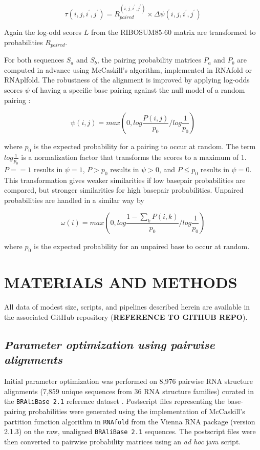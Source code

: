 \documentclass[a4paper,twoside]{article}
\newcommand\bralibase{\texttt{BRAliBase 2.1}}
\begin{document}
\begin{equation}\label{eq10}
	\tau(i,j,i^\prime,j^\prime) = R_{paired}^{(i,j,i^\prime,j^\prime)}
\times \Delta \psi(i,j,i^\prime,j^\prime)
\end{equation}

Again the log-odd scores $L$ from the RIBOSUM85-60 matrix \cite{Klein14499004}
are transformed to probabilities $R_{paired}$.

For both sequences $S_a$ and $S_b$, the pairing probability matrices $P_a$ and
$P_b$ are computed in advance using McCaskill's algorithm, implemented in
RNAfold or RNAplfold. The robustness of the alignment is improved by applying
log-odds scores $\psi$ of having a specific base pairing against the null model
of a random pairing \cite{Will17432929}:

\begin{equation}\label{eq11}
	\psi(i,j) = max \left( 0, log \frac{P(i,j)}{p_0} / log \frac{1}{p_0} \right)
\end{equation}

where $p_0$ is the expected probability for a pairing to occur at random. The
term $log \frac{1}{p_0}$ is a normalization factor that transforms the scores to
a maximum of 1. $P==1$ results in $\psi=1$, $P>p_0$ results in $\psi>0$, and $P\le
p_0$ results in $\psi=0$.  This transformation gives weaker similarities if low
basepair probabilities are compared, but stronger similarities for high basepair
probabilities. Unpaired probabilities are handled in a similar way by

\begin{equation}\label{eq12}
	\omega(i) = max \left( 0, log \frac{1 - \sum_k P(i,k)}{p_0} / log \frac{1}{p_0} \right)
\end{equation}

where $p_0$ is the expected probability for an unpaired base to occur at
random.

\section{\uppercase{Materials and Methods}}

\noindent All data of modest size, scripts, and pipelines described herein are available in the associated 
GitHub repository (\textbf{REFERENCE TO GITHUB REPO}).

\subsection{\textit{Parameter optimization using pairwise alignments}}
Initial parameter optimization was performed on  8,976 pairwise RNA structure 
alignments  (7,859 unique sequences from 36 RNA structure families) curated in the 
\bralibase{} reference dataset \cite{Wilm2006enhanced}. Postscript files representing 
the base-pairing probabilities were generated using the implementation of McCaskill's
partition function algorithm in \texttt{RNAfold} from the Vienna RNA package (version 2.1.3) on the raw, unaligned 
\bralibase{} sequences. The postscript files were then converted to pairwise probability matrices
using an \textit{ad hoc} java script.  \\
\end{document}
